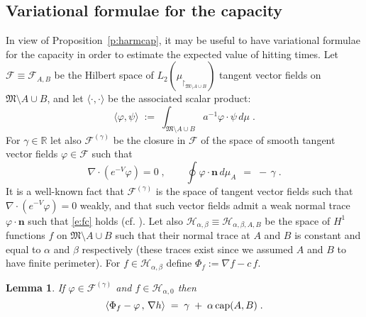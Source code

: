 \documentclass[reqno]{amsart}
\newtheorem{lemma}[theorem]{Lemma}
\newcounter{as}[section]
\newcommand{\mc}[1]{{\mathcal #1}}
\newcommand{\mf}[1]{{\mathfrak #1}}
\newcommand{\bb}[1]{{\mathbb #1}}
\newcommand{\bs}[1]{{\boldsymbol #1}}
\newcommand{\<}{\langle}
\renewcommand{\>}{\rangle}
\renewcommand{\Cap}{{\rm cap}}
\begin{document}
\subsection{Variational formulae for the capacity}
In view of Proposition~\ref{p:harmcap}, it may be useful to have
variational formulae for the capacity in order to estimate the
expected value of hitting times.
Let $\mc F \equiv \mc F_{A,B}$ be the Hilbert space of
$L_2(\mu_{\restriction_{\mf M\setminus A\cup B}})$ tangent vector
fields on $\mf M\setminus A\cup B$, and let $\langle \cdot,\cdot
\rangle$ be the associated scalar product:
\begin{equation*}
\langle \varphi, \psi \rangle \;:=\;
\int_{\mf M\setminus {A\cup B}} a^{-1} \varphi \cdot \psi\, d\mu
\;.
\end{equation*}
For $\gamma\in \bb R$ let also $\mc F^{(\gamma)}$ be the closure in $\mc
F$ of the space of smooth tangent vector fields $\varphi\in \mc F$
such that
\begin{equation}
\label{e:fc}
\nabla \cdot (e^{-V}\varphi)=0\;,\qquad
\oint \varphi \cdot \bs n\, d\mu_A\,  \;=\; -\, \gamma\;.
\end{equation}
It is a well-known fact that $\mc F^{(\gamma)}$ is the space of tangent
vector fields such that $\nabla \cdot (e^{-V}\varphi) =0$ weakly, and
that such vector fields admit a weak normal trace $\varphi \cdot \bs
n$ such that \eqref{e:fc} holds (cf. \cite[Theorem~2.2]{cf}).
Let also $\mc H_{\alpha,\beta} \equiv \mc H_{\alpha,\beta,A,B}$ be the
space of $H^1$ functions $f$ on $\mf M\setminus A\cup B$ such that
their normal trace at $A$ and $B$ is constant and equal to $\alpha$
and $\beta$ respectively (these traces exist since we assumed $A$ and
$B$ to have finite perimeter). For $f \in \mc H_{\alpha,\beta}$ define
$\Phi_f:=\nabla f-c\,f$.
\begin{lemma}
\label{l:circ}
If $\varphi\in \mc F^{(\gamma)}$ and $f\in \mc H_{\alpha,0}$ then
\begin{equation*}
\langle \Phi_f-\varphi \,,\, \nabla h\rangle
\;=\; \gamma\;+\; \alpha\,\Cap(A,B)\;.
\end{equation*}
\end{lemma}
\end{document}
